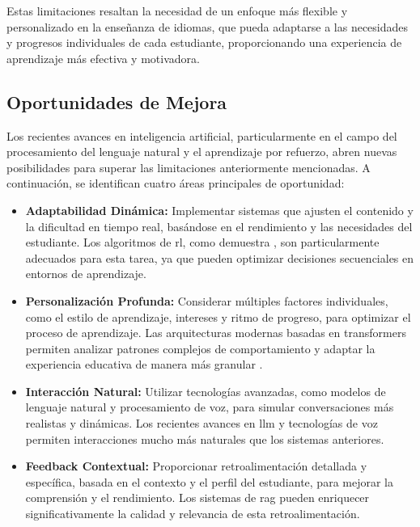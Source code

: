 Estas limitaciones resaltan la necesidad de un enfoque más flexible y personalizado en la enseñanza de idiomas, que pueda adaptarse a las necesidades y progresos individuales de cada estudiante, proporcionando una experiencia de aprendizaje más efectiva y motivadora.

\subsection{Oportunidades de Mejora}
\label{subsec:oportunidades-de-mejora}

Los recientes avances en inteligencia artificial, particularmente en el campo del procesamiento del lenguaje natural y el aprendizaje por refuerzo, abren nuevas posibilidades para superar las limitaciones anteriormente mencionadas. A continuación, se identifican cuatro áreas principales de oportunidad:

\begin{itemize}
  \item \textbf{Adaptabilidad Dinámica:} Implementar sistemas que ajusten el contenido y la dificultad en tiempo real, basándose en el rendimiento y las necesidades del estudiante. Los algoritmos de \gls{rl}, como demuestra \cite{williams2017educational}, son particularmente adecuados para esta tarea, ya que pueden optimizar decisiones secuenciales en entornos de aprendizaje.
  
  \item \textbf{Personalización Profunda:} Considerar múltiples factores individuales, como el estilo de aprendizaje, intereses y ritmo de progreso, para optimizar el proceso de aprendizaje. Las arquitecturas modernas basadas en \gls{transformers} permiten analizar patrones complejos de comportamiento y adaptar la experiencia educativa de manera más granular \cite{vaswani2017attention}.
  
  \item \textbf{Interacción Natural:} Utilizar tecnologías avanzadas, como modelos de lenguaje natural y procesamiento de voz, para simular conversaciones más realistas y dinámicas. Los recientes avances en \gls{llm} \cite{brown2020language} y tecnologías de voz \cite{graves2013speech} permiten interacciones mucho más naturales que los sistemas anteriores.
  
  \item \textbf{Feedback Contextual:} Proporcionar retroalimentación detallada y específica, basada en el contexto y el perfil del estudiante, para mejorar la comprensión y el rendimiento. Los sistemas de \gls{rag} \cite{lewis2020retrieval} pueden enriquecer significativamente la calidad y relevancia de esta retroalimentación.
\end{itemize}

